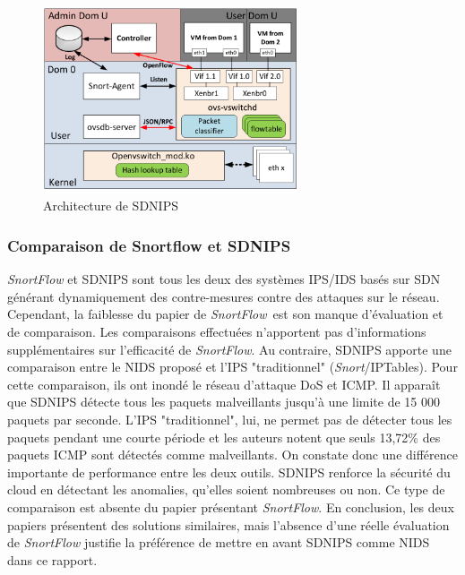 \begin{figure}[h]
	\center
	\includegraphics[height=5.5cm]{./pics/SDNIPS_architecture.png}
	\caption{Architecture de SDNIPS \cite{sdnips}}
	\label{label-image6}
\end{figure}


\subsubsection{Comparaison de Snortflow et SDNIPS}

\textit{SnortFlow} et SDNIPS sont tous les deux des systèmes IPS/IDS basés sur SDN générant dynamiquement des contre-mesures contre des attaques sur le réseau. 
Cependant, la faiblesse du papier de \textit{SnortFlow} est son manque d'évaluation et de comparaison. Les comparaisons effectuées n'apportent pas d'informations supplémentaires sur l'efficacité de \textit{SnortFlow}. Au contraire, SDNIPS apporte une comparaison entre le NIDS proposé et l'IPS "traditionnel" (\textit{Snort}/IPTables). Pour cette comparaison, ils ont inondé le réseau d'attaque DoS et ICMP. Il apparaît que SDNIPS détecte tous les paquets malveillants jusqu'à une limite de 15 000 paquets par seconde. L'IPS "traditionnel", lui, ne permet pas de détecter tous les paquets pendant une courte période et les auteurs notent que seuls 13,72\% des paquets ICMP sont détectés comme malveillants. On constate donc une différence importante de performance entre les deux outils. SDNIPS renforce la sécurité du cloud en détectant les anomalies, qu'elles soient nombreuses ou non. Ce type de comparaison est absente du papier présentant \textit{SnortFlow}. En conclusion, les deux papiers présentent des solutions similaires, mais l'absence d'une réelle évaluation de \textit{SnortFlow} justifie la préférence de mettre en avant SDNIPS comme NIDS dans ce rapport.

